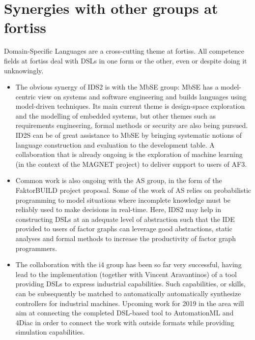 \documentclass{article}
\begin{document}
\section{Synergies with other groups at fortiss}

Domain-Specific Languages are a cross-cutting theme at fortiss. All
competence fields at fortiss deal with DSLs in one form or the
other, even or despite doing it unknowingly.

\begin{itemize}
\item The obvious synergy of IDS2 is with the MbSE group: MbSE has a
model-centric view on systems and software engineering and builds languages using model-driven
techniques. Its main current theme is design-space exploration and the modelling
of  embedded systems, but other themes such as requirements engineering, formal
methods or security are also being pursued. ID2S can be of great assistance to
MbSE by bringing systematic notions of language construction and evaluation to
the development table. A collaboration that is already ongoing is the
exploration of machine learning (in the context of the MAGNET project) to deliver support to users of AF3.
\item Common work is also ongoing with the AS group, in the form of the
FaktorBUILD project proposal. Some of the work of AS relies on probabilistic
programming to model situations where incomplete knowledge must be reliably used
to make decisions in real-time. Here, IDS2 may help in constructing DSLs at an
adequate level of abstraction such that the IDE provided to users of factor
graphs can leverage good abstractions, static analyses and formal methods to
increase the productivity of factor graph programmers.
\item The collaboration with the i4 group has been so far very successful,
having lead to the implementation (together with Vincent Aravantinos) of a tool
providing DSLs to express industrial capabilities. Such capabilities, or
skills, can be subsequently be matched to automatically automatically synthesize
controllers for industrial machines. Upcoming work for 2019 in the area will aim
at connecting the completed DSL-based tool to AutomationML and 4Diac in order
to connect the work with outside formats while providing simulation capabilities. 
\end{itemize}

\pagebreak
\end{document}
